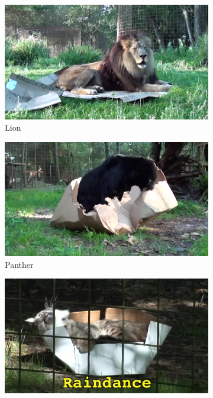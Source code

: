 \documentclass[12pt,a4paper]{article}
\begin{document}
\begin{figure}[h!]
    \centering
    \begin{subfigure}[b]{0.24\textwidth}
        \includegraphics[width=\textwidth]{01_joseph_lion.jpg}
        \caption{Lion}
        \label{fig:lion}
    \end{subfigure}
    \hfill
    \begin{subfigure}[b]{0.24\textwidth}
        \includegraphics[width=\textwidth]{02_jumanji_panther.jpg}
        \caption{Panther}
        \label{fig:panther}
    \end{subfigure}
    \hfill
    \begin{subfigure}[b]{0.24\textwidth}
        \includegraphics[width=\textwidth]{03_raindance_bobcat.jpg}

\end{subfigure}
\end{figure}
\end{document}
